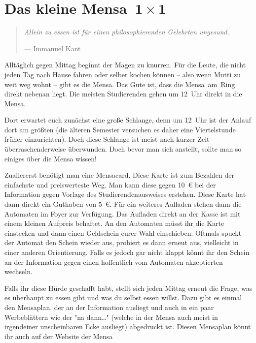 \section[Das kleine Mensa~1~×~1]{Das kleine Mensa~$\mathbf{1 \times 1}$}
\begin{multicols*}{2}
\begin{quote}
\textit{Allein zu essen ist für einen philosophierenden Gelehrten ungesund.}

\hfill--- Immanuel Kant
\end{quote}

\begin{figure}
\end{figure}
Alltäglich gegen Mittag beginnt der Magen zu knurren. Für die Leute, die nicht jeden Tag nach Hause fahren oder selber kochen können -- also wenn Mutti zu weit weg wohnt -- gibt es die Mensa. Das Gute ist, dass die Mensa~am~Ring direkt nebenan liegt. Die meisten Studierenden gehen um 12~Uhr direkt in die Mensa.

Dort erwartet euch zunächst eine große Schlange, denn um 12~Uhr ist der Anlauf dort am größten (die älteren Semester versuchen es daher eine Viertelstunde früher einzurichten). Doch diese Schlange ist meist nach kurzer Zeit überraschenderweise überwunden. Doch bevor man sich anstellt, sollte man so einiges über die Mensa wissen!

Zuallererst benötigt man eine Mensacard. Diese Karte ist zum Bezahlen der einfachste und preiswerteste Weg. Man kann diese gegen \SI{10}{\euro} bei der Information gegen Vorlage des Studierendenausweises erstehen. Diese Karte hat dann direkt ein Guthaben von \SI{5}{\euro}. Für ein weiteres Aufladen stehen dann die Automaten im Foyer zur Verfügung. Das Aufladen direkt an der Kasse ist mit einem kleinen Aufpreis behaftet. An den Automaten müsst ihr die Karte einstecken und dann einen Geldschein eurer Wahl einschieben. Oftmals spuckt der Automat den Schein wieder aus, probiert es dann erneut aus, vielleicht in einer anderen Orientierung. Falls es jedoch gar nicht klappt könnt ihr den Schein an der Information gegen einen hoffentlich vom Automaten akzeptierten wechseln.

Falls ihr diese Hürde geschafft habt, stellt sich jeden Mittag erneut die Frage, was es überhaupt zu essen gibt und was du selbst essen willst. Dazu gibt es einmal den Mensaplan, der an der Information ausliegt und auch in ein paar Werbeblättern wie der "na dann\dots" (welche in der Mensa auch meist in irgendeiner unscheinbaren Ecke ausliegt) abgedruckt ist. Diesen Mensaplan könnt ihr auch auf der Website der Mensa


\end{multicols*}
